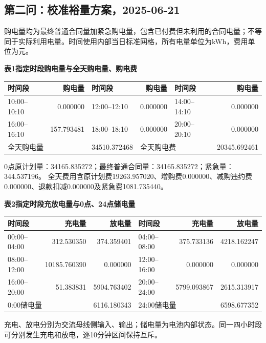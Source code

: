 \subsection{第二问：校准裕量方案，2025-06-21}
\begingroup\small
\setlength{\tabcolsep}{4pt}\renewcommand{\arraystretch}{1.08}
\setlength{\LTpre}{4pt}\setlength{\LTpost}{4pt}
\noindent 购电量均为最终普通合同量加紧急购电量，包含已付费但未利用的合同电量；不等同于实际利用电量。时间使用内部当日标准网格，所有电量单位为kWh，费用单位为元。
\begin{center}\textbf{表1\quad 指定时段购电量与全天购电量、购电费}\par\smallskip
\begin{tabular}{lr lr lr}\toprule
时间段 & 购电量 & 时间段 & 购电量 & 时间段 & 购电量\\\midrule
10:00--10:10 & 0.000000 & 12:00--12:10 & 0.000000 & 14:00--14:10 & 0.000000\\
16:00--16:10 & 157.793481 & 18:00--18:10 & 0.000000 & 20:00--20:10 & 0.000000\\
\midrule
\multicolumn{2}{l}{全天购电量} & 34510.372468 & \multicolumn{2}{l}{全天购电费} & 20345.692461\\
\bottomrule\end{tabular}\end{center}
\noindent 0点原计划量：34165.835272；最终普通合同量：34165.835272；紧急量：344.537196。
全天费用含原计划费19263.957020、增购费0.000000、减购违约费0.000000、退款扣减0.000000及紧急费1081.735440。
\begin{center}\textbf{表2\quad 指定时段充放电量与0点、24点储电量}\par\smallskip
\begin{tabular}{lrr lrr}\toprule
时间段 & 充电量 & 放电量 & 时间段 & 充电量 & 放电量\\\midrule
00:00--04:00 & 312.530350 & 374.359401 & 04:00--08:00 & 375.733136 & 4218.162247\\
08:00--12:00 & 10185.760390 & 0.000000 & 12:00--16:00 & 0.000000 & 0.000000\\
16:00--20:00 & 51.383831 & 5904.763402 & 20:00--24:00 & 5799.093867 & 2615.313917\\
\midrule
\multicolumn{2}{l}{0:00储电量} & 6116.180343 & \multicolumn{2}{l}{24:00储电量} & 6598.677352\\
\bottomrule\end{tabular}\end{center}
\noindent 充电、放电分别为交流母线侧输入、输出；储电量为电池内部状态。同一四小时段可分别发生充电和放电，逐10分钟区间保持互斥。
